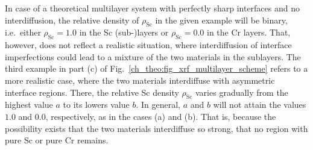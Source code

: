In case of a theoretical multilayer system with perfectly sharp interfaces and no interdiffusion, the relative density of $\rho_\text{Sc}$ in the given example will be binary, i.e.~either $\rho_\text{Sc} = 1.0$ in the Sc (sub-)layers or $\rho_\text{Sc} = 0.0$ in the Cr layers. That, however, does not reflect a realistic situation, where interdiffusion of interface imperfections could lead to a mixture of the two materials in the sublayers. The third example in part (c) of Fig.~\ref{ch_theo:fig_xrf_multilayer_scheme} refers to a more realistic case, where the two materials interdiffuse with asymmetric interface regions. There, the relative Sc density $\rho_\text{Sc}$ varies gradually from the highest value $a$ to its lowers value $b$. In general, $a$ and $b$ will not attain the values $1.0$ and $0.0$, respectively, as in the cases (a) and (b). That is, because the possibility exists that the two materials interdiffuse so strong, that no region with pure Sc or pure Cr remains.


